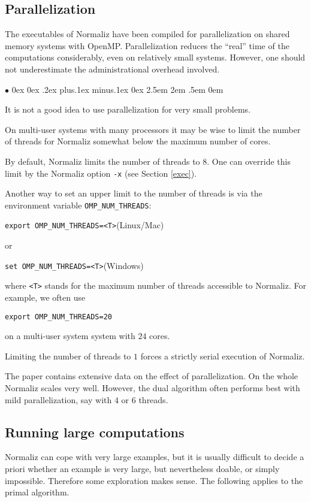 \documentclass[12pt,a4paper]{scrartcl}
\newcommand{\stdli}{ \topsep0ex \partopsep0ex %
\parsep.2ex plus.1ex minus.1ex \itemsep0ex%
\leftmargin2.5em \labelwidth2em \labelsep.5em \rightmargin0em}%
\renewenvironment{itemize}{\begin{list}{{$\bullet$}}{\stdli}}{\end{list}}
\theoremstyle{definition}
\def\ttt{\texttt}
\begin{document}
\subsection{Parallelization}\label{PerfPar}

The executables of Normaliz have been compiled for parallelization
on shared memory systems with OpenMP. Parallelization reduces the
``real'' time of the computations considerably, even on relatively
small systems. However, one should not underestimate the
administrational overhead involved.
\begin{itemize}
\item It is not a good idea to use parallelization for very small problems.
\item On multi-user systems with many processors it may be wise to limit
the number of threads for Normaliz somewhat below the maximum
number of cores.
\end{itemize}
By default, Normaliz limits the number of threads to 8. One can override this limit by the Normaliz
option \ttt{-x} (see Section \ref{exec}).

Another way to set an upper limit to the number of threads is via the environment variable \verb|OMP_NUM_THREADS|:
\begin{center}
	\verb+export OMP_NUM_THREADS=<T>+\qquad (Linux/Mac)
\end{center}
or
\begin{center}
	\verb+set OMP_NUM_THREADS=<T>+\qquad (Windows)
\end{center}
where \ttt{<T>} stands for the maximum number of threads
accessible to Normaliz. For example, we often use
\begin{center}
	\verb+export OMP_NUM_THREADS=20+
\end{center}
on a multi-user system system with $24$ cores.

Limiting the number of threads to $1$ forces a strictly serial
execution of Normaliz.

The paper \cite{BIS} contains extensive data on the effect of parallelization. On the whole Normaliz scales very well.
However, the dual algorithm often performs best with mild parallelization, say with $4$ or $6$ threads.

\subsection{Running large computations}\label{Large}

Normaliz can cope with very large examples, but  it
is usually difficult to decide a priori whether an example is
very large, but nevertheless doable, or simply impossible.
Therefore some exploration makes sense. The following applies to the primal algorithm.
\end{document}
